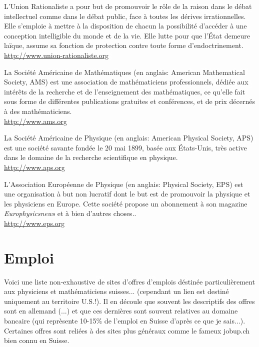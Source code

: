 		{\Large {}}{\Large {}}{\Large {}}\bcdfrance{} L'Union Rationaliste a pour but de promouvoir le rôle de la raison dans le débat intellectuel comme dans le débat public, face à toutes les dérives irrationnelles. Elle s'emploie à mettre à la disposition de chacun la possibilité d'accéder à une conception intelligible du monde et de la vie. Elle lutte pour que l'État demeure laïque, assume sa fonction de protection contre toute forme d'endoctrinement.\\
		\href{http://www.union-rationaliste.org}{\color{blue}http://www.union-rationaliste.org}
		
		{\Large {}}{\Large {}} La Société Américaine de Mathématiques (en anglais: American Mathematical Society, AMS) est une association de mathématiciens professionnels, dédiée aux intérêts de la recherche et de l'enseignement des mathématiques, ce qu'elle fait sous forme de différentes publications gratuites et conférences, et de prix décernés à des mathématiciens.\\
		\href{http://www.ams.org}{\color{blue}http://www.ams.org}
		
		{\Large {}}{\Large {}} La Société Américaine de Physique (en anglais: American Physical Society, APS) est une société savante fondée le 20 mai 1899, basée aux États-Unis, très active dans le domaine de la recherche scientifique en physique.\\
		\href{http://www.aps.org}{\color{blue}http://www.aps.org}
		
		{\Large {}}{\Large {}}{\Large {}} L'Association Européenne de Physique (en anglais: Physical Society, EPS) est une organisation à but non lucratif dont le but est de promouvoir la physique et les physiciens en Europe. Cette société propose un abonnement à son magazine \textit{Europhysicsnews} et à bien d’autres choses..\\
		\href{http://www.eps.org}{\color{blue}http://www.eps.org}

	\pagebreak
	\section{Emploi}
	
	{\Large {}} Voici une liste non-exhaustive de sites d'offres d'emplois déstinée particulièrement aux physiciens et mathématiciens suisses... (cependant un lien est destiné uniquement au territoire U.S.!). Il en découle que souvent les descriptifs des offres sont en allemand (...) et que ces dernières sont souvent relatives au domaine bancaire (qui reprèsente 10-15\% de l'emploi en Suisse d'après ce que je sais...). Certaines offres sont reliées à des sites plus généraux comme le fameux jobup.ch bien connu en Suisse.
	
